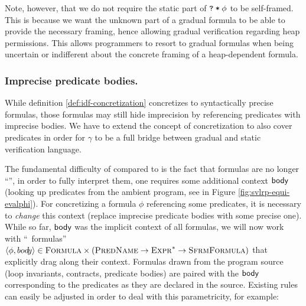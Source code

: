 \documentclass {llncs}
\begin{document}
Note, however, that we do not require the static part of ${\textup{\texttt{?}}}\:\textup{\texttt{*}}\:{\phi}$ to be self-framed.
This is because we want the unknown part of a gradual formula to be able to provide the necessary framing, hence allowing gradual verification regarding heap permissions.
 This allows programmers to resort to gradual formulas when being uncertain or indifferent about the concrete framing of a heap-dependent formula.

\subsubsection{Imprecise predicate bodies.}\label{subsec:locality}
While definition \ref{def:idf-concretization} concretizes to syntactically precise formulas, those formulas may still hide imprecision by referencing predicates with imprecise bodies.
We have to extend the concept of concretization to also cover predicates in order for $\gamma$ to be a full bridge between gradual and static verification language.

The fundamental difficulty of \svlrp compared to \svl is the fact that formulas are no longer “\local”, \ie in order to fully interpret them, one requires some additional context $\textup{\textmd{\textsf{body}}}$ (looking up predicates from the ambient program, see  in Figure \ref{fig:svlrp-equi-evalphi}).
For concretizing a formula $\phi$ referencing some predicates, it is necessary to \emph{change} this context (\eg replace imprecise predicate bodies with some precise one).
While so far, $\textup{\textmd{\textsf{body}}}$ was the implicit context of all formulas, we will now work with “\local~formulas” $\langle \phi, bod{\!y} \rangle \in \textup{\textsc{Formula}} \times (\textup{\textsc{PredName}} \rightarrow \textup{\textsc{Expr}}^* \rightarrow \textup{\textsc{SfrmFormula}})$ that explicitly drag along their context.
Formulas drawn from the program source (loop invariants, contracts, predicate bodies) are paired with the $\textup{\textmd{\textsf{body}}}$ corresponding to the predicates as they are declared in the source.
Existing rules can easily be adjusted in order to deal with this parametricity, for example:
\end{document}
